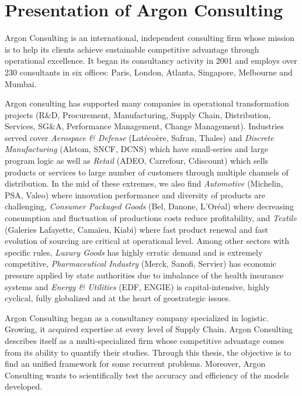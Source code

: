 \section{Presentation of Argon Consulting}


Argon Consulting is an international, independent consulting firm whose mission is to help its clients achieve sustainable competitive advantage through operational excellence.
It began its consultancy activity in 2001 and employs over 230 consultants in six offices: Paris, London, Atlanta, Singapore, Melbourne and Mumbai.


Argon consulting has supported many companies in operational transformation projects (R\&D, Procurement, Manufacturing, Supply Chain, Distribution, Services, SG\&A, Performance Management, Change Management).
Industries served cover
\emph{Aerospace \& Defense} (Lat\'eco\`ere, Safran, Thales) and
\emph{Discrete Manufacturing} (Alstom, SNCF, DCNS) which have small-series and large program logic as well as
\emph{Retail} (ADEO, Carrefour, Cdiscount) which sells products or services to large number of customers through multiple channels of distribution.
In the mid of these extremes, we also find
\emph{Automotive} (Michelin, PSA, Valeo) where innovation performance and diversity of products are challenging,
\emph{Consumer Packaged Goods} (Bel, Danone, L'Oréal) where decreasing consumption and fluctuation of productions costs reduce profitability, and
\emph{Textile} (Galeries Lafayette, Cama\"ieu, Kiabi) where fast product renewal and fast evolution of sourcing are critical at operational level.
Among other sectors with specific rules,
\emph{Luxury Goods} has highly erratic demand and is extremely competitive,
\emph{Pharmaceutical Industry} (Merck, Sanofi, Servier) has economic pressure applied by state authorities due to imbalance of the health insurance systems and
\emph{Energy \& Utilities} (EDF, ENGIE) is capital-intensive, highly cyclical, fully globalized and at the heart of geostrategic issues.


Argon Consulting began as a consultancy company specialized in logistic.
Growing, it acquired expertise at every level of Supply Chain.
Argon Consulting describes itself as a multi-specialized firm whose competitive advantage comes from its ability to quantify their studies.
Through this thesis, the objective is to find an unified framework for some recurrent problems.
Moreover, Argon Consulting wants to scientifically test the accuracy and efficiency of the models developed.






